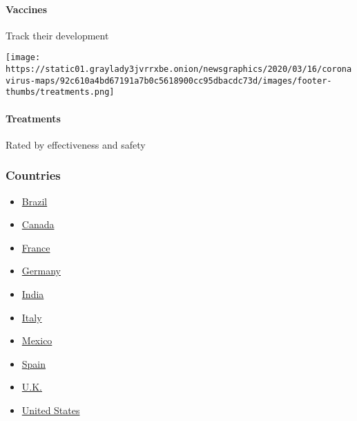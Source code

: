 \hypertarget{vaccines}{%
\paragraph{Vaccines}\label{vaccines}}

Track their development

\href{https://www.nytimes3xbfgragh.onion/interactive/2020/science/coronavirus-drugs-treatments.html}{}

\texttt{[image: https://static01.graylady3jvrrxbe.onion/newsgraphics/2020/03/16/coronavirus-maps/92c610a4bd67191a7b0c5618900cc95dbacdc73d/images/footer-thumbs/treatments.png]}

\hypertarget{treatments}{%
\paragraph{Treatments}\label{treatments}}

Rated by effectiveness and safety

\hypertarget{countries}{%
\subsubsection{Countries}\label{countries}}

\begin{itemize}
\tightlist
\item
  \href{https://www.nytimes3xbfgragh.onion/interactive/2020/world/americas/brazil-coronavirus-cases.html}{Brazil}
\item
  \href{https://www.nytimes3xbfgragh.onion/interactive/2020/world/canada/canada-coronavirus-cases.html}{Canada}
\item
  \href{https://www.nytimes3xbfgragh.onion/interactive/2020/world/europe/france-coronavirus-cases.html}{France}
\item
  \href{https://www.nytimes3xbfgragh.onion/interactive/2020/world/europe/germany-coronavirus-cases.html}{Germany}
\item
  \href{https://www.nytimes3xbfgragh.onion/interactive/2020/world/asia/india-coronavirus-cases.html}{India}
\item
  \href{https://www.nytimes3xbfgragh.onion/interactive/2020/world/europe/italy-coronavirus-cases.html}{Italy}
\item
  \href{https://www.nytimes3xbfgragh.onion/interactive/2020/world/americas/mexico-coronavirus-cases.html}{Mexico}
\item
  \href{https://www.nytimes3xbfgragh.onion/interactive/2020/world/europe/spain-coronavirus-cases.html}{Spain}
\item
  \href{https://www.nytimes3xbfgragh.onion/interactive/2020/world/europe/united-kingdom-coronavirus-cases.html}{U.K.}
\item
  \href{https://www.nytimes3xbfgragh.onion/interactive/2020/us/coronavirus-us-cases.html}{United
  States}
\end{itemize}

